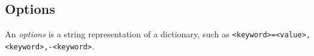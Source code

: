 \subsection{Options}
\label{options}

An \emph{options} is a string representation of a dictionary, such as \texttt{<keyword>=<value>,<keyword>,-<keyword>}.